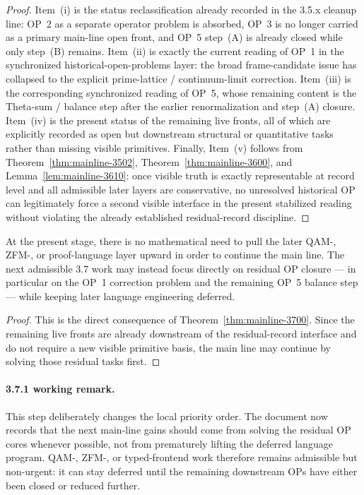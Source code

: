 \begin{proof}
Item~(i) is the status reclassification already recorded in the 3.5.x cleanup line: OP~2 as a separate operator problem is absorbed, OP~3 is no longer carried as a primary main-line open front, and OP~5 step~(A) is already closed while only step~(B) remains. Item~(ii) is exactly the current reading of OP~1 in the synchronized historical-open-problems layer: the broad frame-candidate issue has collapsed to the explicit prime-lattice / continuum-limit correction. Item~(iii) is the corresponding synchronized reading of OP~5, whose remaining content is the Theta-sum / balance step after the earlier renormalization and step~(A) closure. Item~(iv) is the present status of the remaining live fronts, all of which are explicitly recorded as open but downstream structural or quantitative tasks rather than missing visible primitives. Finally, Item~(v) follows from Theorem~\ref{thm:mainline-3502}, Theorem~\ref{thm:mainline-3600}, and Lemma~\ref{lem:mainline-3610}: once visible truth is exactly representable at record level and all admissible later layers are conservative, no unresolved historical OP can legitimately force a second visible interface in the present stabilized reading without violating the already established residual-record discipline.
\end{proof}

\begin{corollary}
\label{cor:mainline-3700}
At the present stage, there is no mathematical need to pull the later QAM-, ZFM-, or proof-language layer upward in order to continue the main line. The next admissible 3.7 work may instead focus directly on residual OP closure --- in particular on the OP~1 correction problem and the remaining OP~5 balance step --- while keeping later language engineering deferred.
\end{corollary}

\begin{proof}
This is the direct consequence of Theorem~\ref{thm:mainline-3700}. Since the remaining live fronts are already downstream of the residual-record interface and do not require a new visible primitive basis, the main line may continue by solving those residual tasks first.
\end{proof}

\paragraph{3.7.1 working remark.}
This step deliberately changes the local priority order. The document now records that the next main-line gains should come from solving the residual OP cores whenever possible, not from prematurely lifting the deferred language program. QAM-, ZFM-, or typed-frontend work therefore remains admissible but non-urgent: it can stay deferred until the remaining downstream OPs have either been closed or reduced further.

